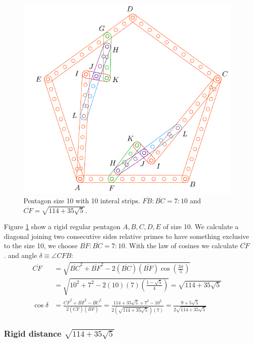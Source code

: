 \documentclass[11pt]{article}
\begin{document}
\begin{figure}[h]
 \centering
 \includegraphics[scale=0.9]{10/penta10a}
 \caption{Pentagon size 10 with 10 interal strips. $\overline{FB}:\overline{BC} = 7:10$ and $\overline{CF} = \sqrt{114 + 35\sqrt5}$.}
 \label{fig:penta10a}
\end{figure}

Figure \ref{fig:penta10a} show a rigid regular pentagon $A,B,C,D,E$ of size 10. We calculate a diagonal joining two consecutive sides relative primes to have something exclusive to the size 10, we choose $\overline{BF}:\overline{BC} = 7:10$. With the law of cosines we calculate $\overline{CF}$.
and angle $\delta \equiv \angle{CFB}$:
\begin{align}
\overline{CF} &= \sqrt{\overline{BC}^2 + \overline{BF}^2
 - 2(\overline{BC})(\overline{BF})\cos\left(\frac{3\pi}5\right)} \nonumber\\
 &= \sqrt{10^2 + 7^2 - 2(10)(7)\left(\frac{1-\sqrt5}4\right)}
 = \sqrt{114 + 35\sqrt5} \\
\cos\delta &= \frac{\overline{CF}^2 + \overline{BF}^2 - \overline{BC}^2}
 {2(\overline{CF})(\overline{BF})}
 = \frac{114+35\sqrt5 + 7^2 - 10^2}{2(\sqrt{114 + 35\sqrt5})(7)}
  = \frac{9+5\sqrt5}{2\sqrt{114+35\sqrt5}}
\end{align}

\subsubsection{Rigid distance $\sqrt{114+35\sqrt5}$}
\end{document}

